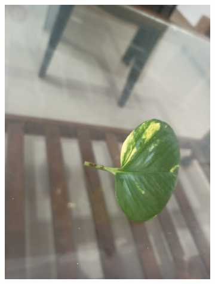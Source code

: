 \documentclass[twocolumn]{article}
\begin{document}
\begin{figure}[H]
\begin{subfigure}[b]{0.30\columnwidth}
        \includegraphics[width=\textwidth]{money6}
    \end{subfigure}
    \vspace{0.5em}
    

\end{figure}
\end{document}
